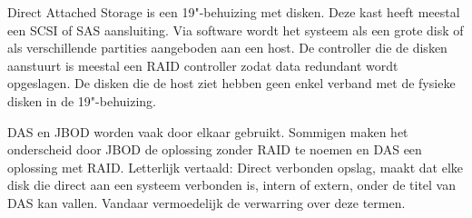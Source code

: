 Direct Attached Storage is een 19"-behuizing met disken. Deze kast heeft meestal een SCSI of SAS aansluiting. Via software wordt het systeem als een grote disk of als verschillende partities aangeboden aan een host. De controller die de disken aanstuurt is meestal een RAID controller zodat data redundant wordt opgeslagen. De disken die de host ziet hebben geen enkel verband met de fysieke disken in de 19"-behuizing.

DAS en JBOD worden vaak door elkaar gebruikt. Sommigen maken het onderscheid door JBOD de oplossing zonder RAID te noemen en DAS een oplossing met RAID. Letterlijk vertaald: Direct verbonden opslag, maakt dat elke disk die direct aan een systeem verbonden is, intern of extern, onder de titel van DAS kan vallen. Vandaar vermoedelijk de verwarring over deze termen.

